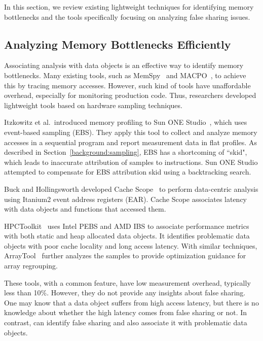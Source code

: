 \label{sec:relatedwork}
In this section, we review existing lightweight techniques for identifying memory bottlenecks and the tools specifically focusing on analyzing false sharing issues.

\subsection{Analyzing Memory Bottlenecks Efficiently}

Associating analysis with data objects is an effective way to identify memory bottlenecks. Many existing tools, such as MemSpy~\cite{} and MACPO~\cite{}, to achieve this by tracing memory accesses. However, such kind of tools have unaffordable overhead, especially for monitoring production code. Thus, researchers developed lightweight tools based on hardware sampling techniques.

Itzkowitz et al.\ introduced memory profiling to Sun ONE Studio~\cite{DBLP:conf/sc/ItzkowitzWAK03}, which uses event-based sampling (EBS). 
They apply this tool to collect and analyze memory accesses in a sequential program and report measurement data in flat profiles. As described in Section~\ref{background:sampling}, EBS has a shortcoming of ``skid", which leads to inaccurate attribution of samples to instructions.
Sun ONE Studio attempted to compensate for EBS attribution skid using a backtracking search.

Buck and Hollingsworth developed Cache Scope~\cite{DBLP:conf/sc/BuckH04} to perform data-centric analysis using 
Itanium2 event address registers (EAR).
Cache Scope associates latency with data objects and functions that accessed them.

HPCToolkit~\cite{ibs-sc} uses Intel PEBS and AMD IBS to associate performance metrics with both static and heap allocated data objects. It identifies problematic data objects with poor cache locality and long access latency. With similar techniques, ArrayTool~\cite{ibs-pact} further analyzes the samples to provide optimization guidance for array regrouping.

These tools, with a common feature, have low measurement overhead, typically less than 10\%. However, they do not provide any insights about false sharing. One may know that a data object suffers from high access latency, but there is no knowledge about whether the high latency comes from false sharing or not. In contrast, \cheetah{} can identify false sharing and also associate it with problematic data objects.


